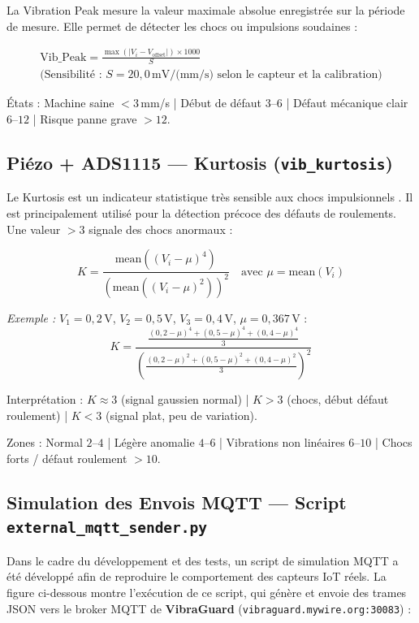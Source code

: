 \documentclass[12pt, a4paper, oneside]{report}
\newcommand{\projectname}{\textbf{VibraGuard}}
\begin{document}
La Vibration Peak mesure la valeur maximale absolue enregistrée sur la période de mesure.
Elle permet de détecter les chocs ou impulsions soudaines :

\begin{multline}
  \text{Vib\_Peak} = \frac{\max(|V_i - V_{\text{offset}}|) \times 1000}{S} \\
  \text{(Sensibilité : } S = 20{,}0\,\text{mV/(mm/s) selon le capteur et la calibration)}
\end{multline}

États : Machine saine $< 3$\,mm/s | Début de défaut $3$--$6$ | Défaut mécanique clair $6$--$12$ | Risque panne grave $> 12$.

\subsection{Piézo + ADS1115 — Kurtosis (\texttt{vib\_kurtosis})}

Le Kurtosis est un indicateur statistique très sensible aux chocs impulsionnels \cite{antoni2006}. Il est
principalement utilisé pour la détection précoce des défauts de roulements. Une valeur $> 3$
signale des chocs anormaux :

\begin{equation}
  K = \frac{\text{mean}\left((V_i - \mu)^4\right)}{\left(\text{mean}\left((V_i - \mu)^2\right)\right)^2}
  \quad \text{avec } \mu = \text{mean}(V_i)
\end{equation}

\noindent\textit{Exemple :} $V_1=0{,}2$\,V, $V_2=0{,}5$\,V, $V_3=0{,}4$\,V, $\mu = 0{,}367$\,V :
\[
K = \frac{\frac{(0{,}2-\mu)^4 + (0{,}5-\mu)^4 + (0{,}4-\mu)^4}{3}}
        {\left(\frac{(0{,}2-\mu)^2 + (0{,}5-\mu)^2 + (0{,}4-\mu)^2}{3}\right)^2}
\]

Interprétation : $K \approx 3$ (signal gaussien normal) | $K > 3$ (chocs, début défaut roulement) | $K < 3$ (signal plat, peu de variation).

Zones : Normal $2$--$4$ | Légère anomalie $4$--$6$ | Vibrations non linéaires $6$--$10$ | Chocs forts / défaut roulement $> 10$.


\subsection{Simulation des Envois MQTT — Script \texttt{external\_mqtt\_sender.py}}

Dans le cadre du développement et des tests, un script de simulation MQTT a été développé
afin de reproduire le comportement des capteurs IoT réels. La figure ci-dessous montre
l'exécution de ce script, qui génère et envoie des trames JSON vers le broker MQTT de
\projectname{} (\texttt{vibraguard.mywire.org:30083}) :
\end{document}
